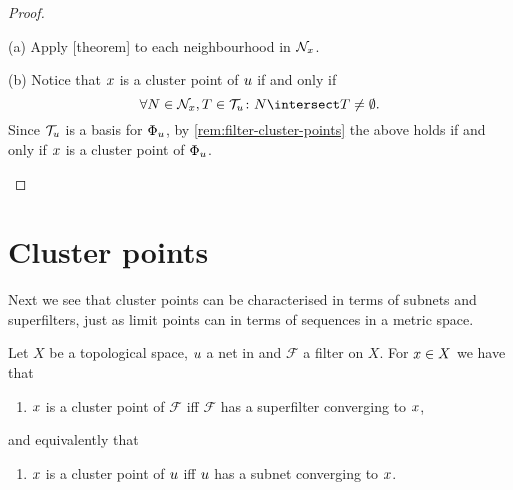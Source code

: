 \documentclass[article, a4paper, 11pt, oneside]{memoir}
\numberwithin{equation}{chapter}
\newcommand{\calF}{\mathcal{F}}
\theoremstyle{nonumberplain}
\begin{document}
\begin{proof}
    \begin{proofsec}
        \item[(a)]
        Apply [theorem] to each neighbourhood in $\nhoods{\mylimit}$.

        \item[(b)]
        Notice that $\mylimit$ is a cluster point of $\mynet$ if and only if
        \begin{equation*}
            \forall N \in \nhoods{\mylimit}, T \in \tails{\mynet} \colon N \intersect T \neq \emptyset.
        \end{equation*}
        Since $\tails{\mynet}$ is a basis for $\evfilt[\mynet]$, by \cref{rem:filter-cluster-points} the above holds if and only if $\mylimit$ is a cluster point of $\evfilt[\mynet]$.
    \end{proofsec}
\end{proof}


\chapter{Cluster points}

Next we see that cluster points can be characterised in terms of subnets and superfilters, just as limit points can in terms of sequences in a metric space.

\begin{proposition}
    Let $X$ be a topological space, $\mynet$ a net in and $\calF$ a filter on $X$. For $\mylimit \in X$ we have that
    \begin{enumerate}
        \item $\mylimit$ is a cluster point of $\calF$ iff $\calF$ has a superfilter converging to $\mylimit$,
    \end{enumerate}
    and equivalently that
    \begin{enumerate}[resume]
        \item $\mylimit$ is a cluster point of $\mynet$ iff $\mynet$ has a subnet converging to $\mylimit$.
    \end{enumerate}
\end{proposition}
\end{document}
